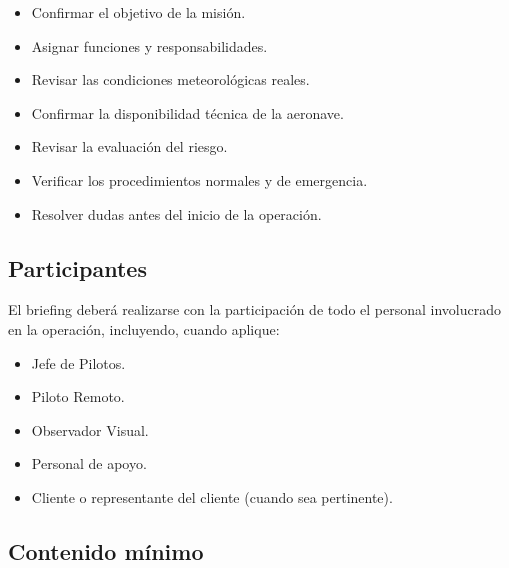 \begin{itemize}

\item Confirmar el objetivo de la misión.

\item Asignar funciones y responsabilidades.

\item Revisar las condiciones meteorológicas reales.

\item Confirmar la disponibilidad técnica de la aeronave.

\item Revisar la evaluación del riesgo.

\item Verificar los procedimientos normales y de emergencia.

\item Resolver dudas antes del inicio de la operación.

\end{itemize}


\subsection{Participantes}

El briefing deberá realizarse con la participación de todo el personal involucrado en la operación, incluyendo, cuando aplique:

\begin{itemize}

\item Jefe de Pilotos.

\item Piloto Remoto.

\item Observador Visual.

\item Personal de apoyo.

\item Cliente o representante del cliente (cuando sea pertinente).

\end{itemize}

\subsection{Contenido mínimo}

\renewcommand{\arraystretch}{1.3}

